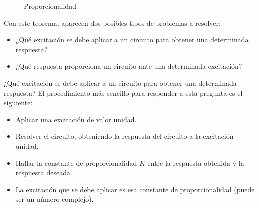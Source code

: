 \documentclass[11pt]{book} %
\makeatletter
\numberwithin{dummy}{section}
\theoremstyle{ocrenumbox}
\theoremstyle{blacknumex}
\theoremstyle{blacknumbox}
\theoremstyle{ocrenum}
\renewcommand{\subsubsection}{\@startsection {subsubsection}{3}{\z@}
{-2ex \@plus -0.1ex \@minus -.2ex}
{.2ex \@plus.2ex }
{\normalfont\small\sffamily\bfseries}}
\newlength\esp
\makeatother
\begin{document}
\begin{figure}[htbp]
        \centering
        \hfil
        \caption{Proporcionalidad}
        \label{fig.proporcionalidad}
    \end{figure}
    
  Con este teorema, aparecen dos posibles tipos de problemas a resolver:
  \begin{itemize}
      \item ¿Qué excitación se debe aplicar a un circuito para obtener una determinada respuesta?
      \item ¿Qué respuesta proporciona un circuito ante una determinada excitación?
  \end{itemize}
  
  \subsubsection{¿Qué excitación se debe aplicar a un circuito para obtener una determinada respuesta?}
  El procedimiento más sencillo para responder a esta pregunta es el siguiente: 
  \begin{itemize}
\item Aplicar una excitación de valor unidad.
\item Resolver el circuito, obteniendo la respuesta del circuito a la excitación unidad.
\item Hallar la constante de proporcionalidad $K$ entre la respuesta obtenida y la respuesta deseada.
\item La excitación que se debe aplicar es esa constante de proporcionalidad (puede ser un número complejo).
\end{itemize}
  
\end{document}
